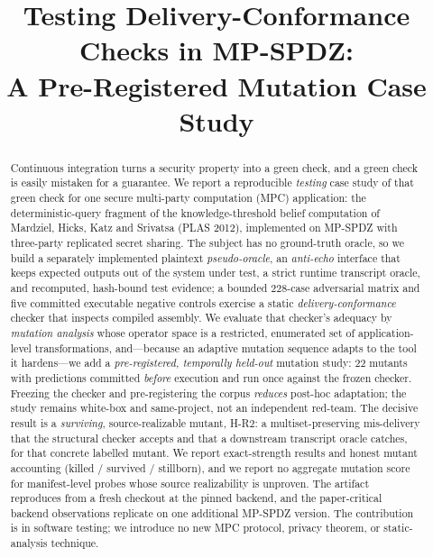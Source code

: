 \documentclass[conference]{IEEEtran}
\begin{document}
\title{Testing Delivery-Conformance Checks in MP-SPDZ:\\
A Pre-Registered Mutation Case Study}

\author{
}

\maketitle

\begin{abstract}
Continuous integration turns a security property into a green check, and a green check
is easily mistaken for a guarantee. We report a reproducible \emph{testing} case study of
that green check for one secure multi-party computation (MPC) application: the
deterministic-query fragment of the knowledge-threshold belief computation of Mardziel,
Hicks, Katz and Srivatsa (PLAS 2012), implemented on MP-SPDZ with three-party replicated
secret sharing. The subject has no ground-truth oracle, so we build a separately
implemented plaintext \emph{pseudo-oracle}, an \emph{anti-echo} interface that keeps
expected outputs out of the system under test, a strict runtime transcript oracle, and
recomputed, hash-bound test evidence; a bounded 228-case adversarial matrix and five
committed executable negative controls exercise a static \emph{delivery-conformance}
checker that inspects compiled assembly. We evaluate that checker's adequacy by
\emph{mutation analysis} whose operator space is a restricted, enumerated set of
application-level transformations, and---because an adaptive mutation sequence adapts to
the tool it hardens---we add a \emph{pre-registered, temporally held-out} mutation study:
22 mutants with predictions committed \emph{before} execution and run once against the
frozen checker. Freezing the checker and pre-registering the corpus \emph{reduces}
post-hoc adaptation; the study remains white-box and same-project, not an independent
red-team. The decisive result is a \emph{surviving}, source-realizable mutant, H-R2: a
multiset-preserving mis-delivery that the structural checker accepts and that a
downstream transcript oracle catches, for that concrete labelled mutant. We report
exact-strength results and honest mutant accounting (killed / survived / stillborn), and
we report no aggregate mutation score for manifest-level probes whose source
realizability is unproven. The artifact reproduces from a fresh checkout at the pinned
backend, and the paper-critical backend observations replicate on one additional MP-SPDZ
version. The contribution is in software testing; we introduce no new MPC protocol,
privacy theorem, or static-analysis technique.
\end{abstract}
\end{document}
